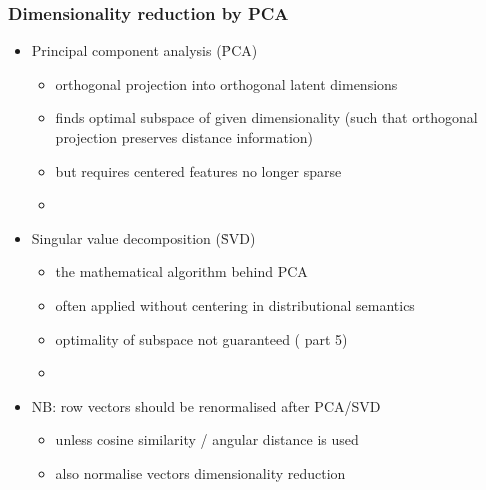 \documentclass[t]{beamer} %
\begin{document}
\begin{frame}
  \frametitle{Dimensionality reduction by PCA}

  \begin{itemize}
  \item Principal component analysis (\h{PCA})
    \begin{itemize}
    \item orthogonal projection into orthogonal latent dimensions
    \item finds optimal subspace of given dimensionality
      (such that orthogonal projection preserves distance information)
    \item but requires centered features \so no longer sparse
    \item[]
    \end{itemize}
  \item<2-> Singular value decomposition (\h{SVD})
    \begin{itemize}
    \item the mathematical algorithm behind PCA
    \item often applied without centering in distributional semantics
    \item optimality of subspace not guaranteed (\hand{} part 5)
    \item[]
    \end{itemize}
  \item<3-> NB: row vectors should be renormalised after PCA/SVD
    \begin{itemize}
    \item unless cosine similarity / angular distance is used
    \item[\hand] also normalise vectors  dimensionality reduction
    \end{itemize}
  \end{itemize}
\end{frame}
\end{document}
